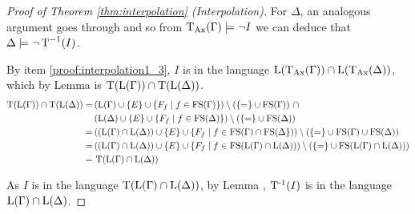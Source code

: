 \begin{proof}[Proof of Theorem \ref{thm:interpolation} (Interpolation)]
			For $\Delta$, an analogous argument goes through and so from $\operatorname{\operatorname{T}_{Ax}}(\Gamma) \models \lnot I$ we can deduce that $\Delta \models \lnot \operatorname{T}^{-1}(I)$.

			By item \ref{proof:interpolation1_3}, $I$ is in the language $\operatorname{L}(\operatorname{\operatorname{T}_{Ax}}(\Gamma)) \cap \operatorname{L}(\operatorname{\operatorname{T}_{Ax}}(\Delta))$, which by Lemma  is $\Trans(\Lang(\Gamma)) \cap\nolinebreak \Trans(\Lang(\Delta)) $. 
			\begin{align*}
				\Trans(\Lang(\Gamma)) \cap\nolinebreak \Trans(\Lang(\Delta)) =\,&
				(\Lang(\Gamma)\cup \{E\}\cup\{F_f\mid f \in \FS(\Gamma)\}) \setminus(\{=\nolinebreak \} \cup\nolinebreak \FS(\Gamma))~\cap \\
				& (\Lang(\Delta)\cup \{E\}\cup\{F_f\mid f \in \FS(\Delta)\}) \setminus(\{=\nolinebreak \} \cup\nolinebreak \FS(\Delta))\\
				=\,& ((\Lang(\Gamma) \cap \Lang(\Delta)) \cup \{E\} \cup\{F_f\mid f \in \FS(\Gamma)\cap\FS(\Delta\}))  \setminus(\{=\} \cup \FS(\Gamma) \cup \FS(\Delta)) \\
				=\,& ((\Lang(\Gamma) \cap \Lang(\Delta)) \cup \{E\} \cup \{F_f\mid f\in \FS( \Lang(\Gamma) \cap \Lang(\Delta)) ) \setminus ( \{=\} \cup \FS(\Lang(\Gamma) \cap \Lang(\Delta)) )  \\ 
				=\,& \Trans(\Lang(\Gamma) \cap \Lang(\Delta))
			\end{align*}

			As $I$ is in the language $\operatorname{T}(\operatorname{L}(\Gamma) \cap \operatorname{L}(\Delta))$, by Lemma , $\operatorname{T^{-1}}(I)$ is in the language $\operatorname{L}(\Gamma) \cap \operatorname{L}(\Delta)$.
		\end{proof}


